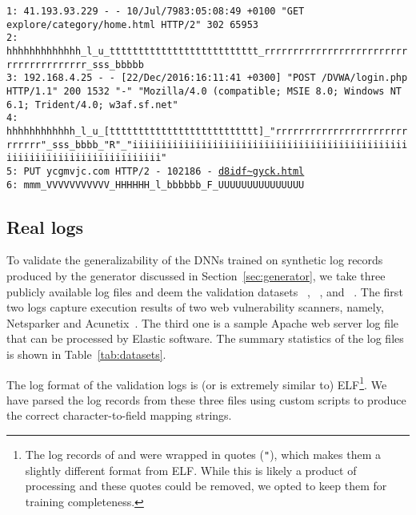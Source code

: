 \documentclass{article}
\begin{document}
\begin{figure*}[t]
    \centering
    \tiny
    \begin{framed}
    \texttt{1: 41.193.93.229 - - 10/Jul/7983:05:08:49 +0100 "GET explore/category/home.html HTTP/2" 302 65953} \\
    \texttt{2: hhhhhhhhhhhhh\_l\_u\_tttttttttttttttttttttttttt\_rrrrrrrrrrrrrrrrrrrrrrrrrrrrrrrrrrrrrrr\_sss\_bbbbb} \\
    \texttt{3: 192.168.4.25 - - [22/Dec/2016:16:11:41 +0300] "POST /DVWA/login.php HTTP/1.1" 200 1532 "-" "Mozilla/4.0 (compatible; MSIE 8.0; Windows NT 6.1; Trident/4.0; w3af.sf.net"} \\
    \texttt{4: hhhhhhhhhhhh\_l\_u\_[tttttttttttttttttttttttttt]\_"rrrrrrrrrrrrrrrrrrrrrrrrrrrrr"\_sss\_bbbb\_"R"\_"iiiiiiiiiiiiiiiiiiiiiiiiiiiiiiiiiiiiiiiiiiiiiiiiiiiiiiiiiiiiiiiiiiiiiiiiiii"} \\
    \texttt{5: PUT ycgmvjc.com HTTP/2 - 102186 - \url{d8idf~gyck.html}} \\
    \texttt{6: mmm\_VVVVVVVVVVV\_HHHHHH\_l\_bbbbbb\_F\_UUUUUUUUUUUUUUU}
    \end{framed}
    \caption{An example of a record for translation generated by our log generator.  Lines 1, 3, and 5 are examples of logs in CLF, ELF, and random format, respectively. The characters in lines 2, 4, and 6 represent mapping to their equivalent field type (described in Table~\ref{tab:fields}).  }
    \label{fig:synth_record}
\end{figure*}


\subsection{Real logs} \label{sec:real_data}

To validate the generalizability of the DNNs trained on synthetic log records produced by the generator discussed in Section~\ref{sec:generator}, we take three publicly available log files and deem the validation datasets ~\cite{apacheht89:online}, ~\cite{apacheht41:online}, and ~\cite{examples55:online}. The first two logs capture execution results of two web vulnerability scanners, namely, Netsparker and Acunetix~\cite{BASSEYYAR201828}. The third one is a sample Apache web server log file that can be processed by Elastic software. The summary statistics of the log files is shown in Table~\ref{tab:datasets}.

The log format of the validation logs is (or is extremely similar to) ELF\footnote{The log records of  and  were wrapped in quotes (\texttt{"}), which makes them a slightly different format from ELF. While this is likely a product of processing and these quotes could be removed, we opted to keep them for training completeness.}. We have parsed the log records from these three files using custom scripts to produce the correct character-to-field mapping strings. 
\end{document}
